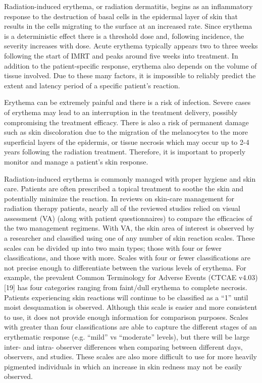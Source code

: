 Radiation-induced erythema, or radiation dermatitis, begins as an inflammatory response to the destruction of  basal cells in the epidermal layer of skin that results in the cells migrating to the surface at an increased rate.\cite{McQuestion2006} Since erythema is a deterministic effect there is a threshold dose and, following incidence, the severity increases with dose. Acute erythema typically appears two to three weeks following the start of IMRT and peaks around five weeks into treatment. In addition to the patient-specific response, erythema also depends on the volume of tissue involved. Due to these many factors, it is impossible to reliably predict the extent and latency period of a specific patient’s reaction.\cite{Porock2002}

Erythema can be extremely painful and there is a risk of infection. Severe cases of erythema may lead to an interruption in the treatment delivery, possibly compromising the treatment efficacy.\cite{Maciejewski1989} There is also a risk of permanent damage such as skin discoloration due to the migration of the melanocytes to the more superficial layers of the epidermis,\cite{McQuestion2006} or tissue necrosis which may occur up to 2-4 years following the radiation treatment.\cite{Lee2002} Therefore, it is important to properly monitor and manage a patient’s skin response.

Radiation-induced erythema is commonly managed with proper hygiene and skin care.\cite{McQuestion2006} Patients are often prescribed a topical treatment to soothe the skin and potentially minimize the reaction. In reviews on skin-care management for radiation therapy patients, nearly all of the reviewed studies relied on visual assessment (VA) (along with patient questionnaires) to compare the efficacies of the two management regimens.\cite{McQuestion2006,Wong2013,Chan2014} With VA, the skin area of interest is observed by a researcher and classified using one of any number of skin reaction scales. These scales can be divided up into two main types; those with four or fewer classifications,\cite{Wan1983a,Cox1995,Lock-Andersen1998,Kirova2011} and those with more.\cite{Pearse1990,Wengstrom2004,Bodekaer2013} Scales with four or fewer classifications are not precise enough to differentiate between the various levels of erythema. For example, the prevalent Common Terminology for Adverse Events (CTCAE v4.03)[19] has four categories ranging from faint/dull erythema to complete necrosis. Patients experiencing skin reactions will continue to be classified as a “1” until moist desquamation is observed. Although this scale is easier and more consistent to use, it does not provide enough information for comparison purposes. Scales with greater than four classifications are able to capture the different stages of an erythematic response (e.g. “mild” vs “moderate” levels), but there will be large inter- and intra- observer differences when comparing between different days, observers, and studies. These scales are also more difficult to use for more heavily pigmented individuals in which an increase in skin redness may not be easily observed.

